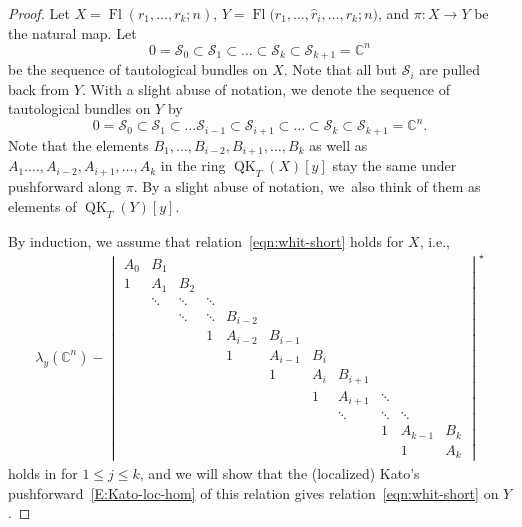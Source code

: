 \documentclass[pdftex]{sigma}
\numberwithin{equation}{section}
\theoremstyle{definition}
\DeclareMathOperator{\Fl}{Fl}
\DeclareMathOperator{\QK}{QK}
\def\loc{{\mathrm{loc}}}
\newcommand{\C}{{\mathbb C}}
\newcommand{\cS}{{\mathcal S}}
\begin{document}
\begin{proof}
Let $X=\Fl(r_1,\dots,r_k;n)$, $Y=\Fl\bigl(r_1,\dots, \widehat{r}_i,\dots, r_k;n\bigr)$, and $\pi\colon X\to Y$ be the natural map. Let
\[
 0=\cS_0\subset\cS_1\subset\dots\subset\cS_k\subset\cS_{k+1}=\C^n
\]
be the sequence of tautological bundles on $X$. Note that all but $\cS_i$ are pulled back from $Y$. With a slight abuse of notation, we denote the sequence of tautological bundles on $Y$ by
\[
 0=\cS_0\subset\cS_1\subset\dots\cS_{i-1}\subset\cS_{i+1}\subset\dots\subset\cS_k\subset\cS_{k+1}=\C^n.
\]
Note that the elements $B_1,\dots,B_{i-2},B_{i+1},\dots,B_k$ as well as $A_1.\dots, A_{i-2},A_{i+1},\dots,A_k$ in the ring $\QK_T(X)[y]$ stay the same under pushforward along $\pi$. By a slight abuse of notation, we~also think of them as elements of $\QK_T(Y)[y]$.

By induction, we assume that relation~\eqref{eqn:whit-short} holds for $X$, i.e.,
\begin{gather}\label{eqn:whitX}
 \lambda_y(\C^n)-\begin{vmatrix}
 A_0 & B_1 & & & & & & & & & \\
 1 & A_1 &B_2 & & & & & & & & \\
 & \ddots & \ddots & \ddots & & & & & & & \\
 & & \ddots & \ddots & B_{i-2} & & &\\ & & & 1 & A_{i-2} & B_{i-1} & & & & &\\ & & & & 1 & A_{i-1} & B_i & & & &\\
 & & & & & 1 & A_i & B_{i+1} & & &\\
 & & & & & & 1 & A_{i+1} & \ddots & &
 \\
 & & & & & & & \ddots & \ddots & \ddots & \\
 & & & & & & & & 1 & A_{k-1} & B_{k}\\
 & & & & & & & & & 1 & A_{k}
 \end{vmatrix}^\star
\end{gather}
holds in \smash{$\QK_T^{\loc(\mathbf{r})}(X)[y]$}
for $1 \le j \le k$, and we will show that the (localized) Kato's pushforward~\eqref{E:Kato-loc-hom} of this relation gives relation~\eqref{eqn:whit-short} on $Y$.


\end{proof}
\end{document}
